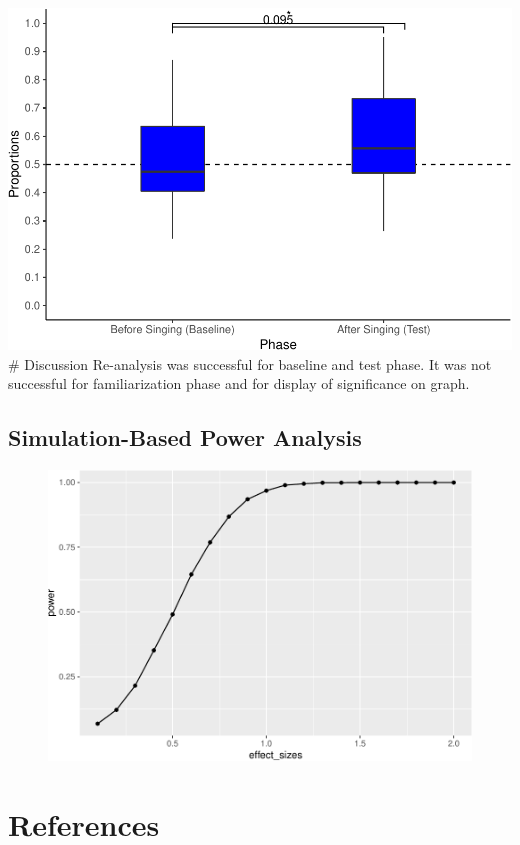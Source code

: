 \documentclass[man,floatsintext]{apa6}
\begin{document}
\includegraphics{Midterm_APA_files/figure-latex/unnamed-chunk-3-1.pdf}
\# Discussion Re-analysis was successful for baseline and test phase. It
was not successful for familiarization phase and for display of
significance on graph.

\subsection{Simulation-Based Power
Analysis}\label{simulation-based-power-analysis}

\begin{figure}
\centering
\includegraphics{Midterm_APA_files/figure-latex/unnamed-chunk-4-1.pdf}
\caption{}
\end{figure}

\newpage

\section{References}\label{references}
\end{document}
